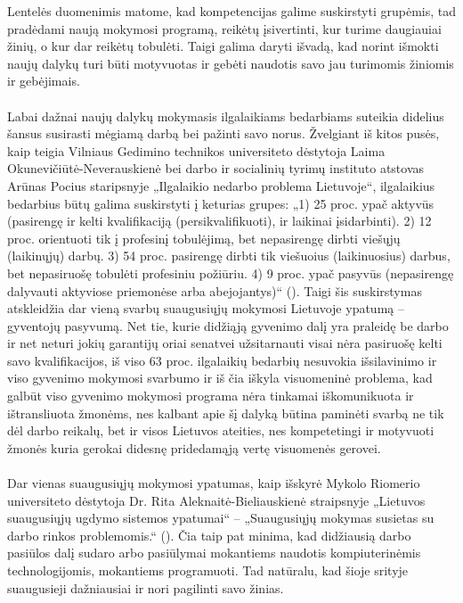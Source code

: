 \documentclass[12pt,a4paper, titlepage]{article}
\begin{document}
	Lentelės duomenimis matome, kad kompetencijas galime  suskirstyti grupėmis, tad pradėdami naują mokymosi programą, reikėtų įsivertinti, kur turime daugiauiai žinių, o kur dar reikėtų tobulėti. Taigi galima daryti išvadą, kad norint išmokti naujų dalykų turi būti motyvuotas ir gebėti naudotis savo jau turimomis žiniomis ir gebėjimais. 
\paragraph{}		
	Labai dažnai naujų dalykų mokymasis ilgalaikiams bedarbiams suteikia didelius šansus susirasti mėgiamą darbą bei pažinti savo norus. Žvelgiant iš kitos pusės, kaip teigia Vilniaus Gedimino technikos universiteto dėstytoja Laima Okunevičiūtė-Neverauskienė bei darbo ir socialinių tyrimų instituto atstovas Arūnas Pocius staripsnyje „Ilgalaikio nedarbo problema Lietuvoje“, ilgalaikius bedarbius būtų galima suskirstyti į keturias grupes: „1) 25 proc. ypač aktyvūs (pasirengę ir kelti kvalifikaciją (persikvalifikuoti), ir laikinai įsidarbinti). 2) 12 proc. orientuoti tik į profesinį tobulėjimą, bet nepasirengę dirbti viešųjų (laikinųjų) darbų. 3) 54 proc. pasirengę dirbti tik viešuoius (laikinuosius) darbus, bet nepasiruošę tobulėti profesiniu požiūriu. 4) 9 proc. ypač pasyvūs (nepasirengę dalyvauti aktyviose priemonėse arba abejojantys)“ (\cite{pocius2003ilgalaikio}). Taigi šis suskirstymas atskleidžia dar vieną svarbų suaugusiųjų mokymosi Lietuvoje ypatumą – gyventojų pasyvumą. Net tie, kurie didžiąją gyvenimo dalį yra praleidę be darbo ir net neturi jokių garantijų oriai senatvei užsitarnauti visai nėra pasiruošę kelti savo kvalifikacijos, iš viso 63 proc. ilgalaikių bedarbių nesuvokia išsilavinimo ir viso gyvenimo mokymosi svarbumo ir iš čia iškyla visuomeninė problema, kad galbūt viso gyvenimo mokymosi programa nėra tinkamai iškomunikuota ir ištransliuota žmonėms, nes kalbant apie šį dalyką būtina paminėti svarbą ne tik dėl darbo reikalų, bet ir visos Lietuvos ateities, nes kompetetingi ir motyvuoti žmonės kuria gerokai didesnę pridedamąją vertę visuomenės gerovei.
\paragraph{}	
	 Dar vienas suaugusiųjų mokymosi ypatumas, kaip išskyrė Mykolo Riomerio universiteto dėstytoja Dr. Rita Aleknaitė-Bieliauskienė straipsnyje „Lietuvos suaugusiųjų ugdymo sistemos ypatumai“ – „Suaugusiųjų mokymas susietas su darbo rinkos problemomis.“ (\cite{aleknaite2014lietuvos}). Čia taip pat minima, kad didžiausią darbo pasiūlos dalį sudaro arbo pasiūlymai mokantiems naudotis kompiuterinėmis technologijomis, mokantiems programuoti. Tad natūralu, kad šioje srityje suaugusieji dažniausiai ir nori pagilinti savo žinias.
\end{document}
